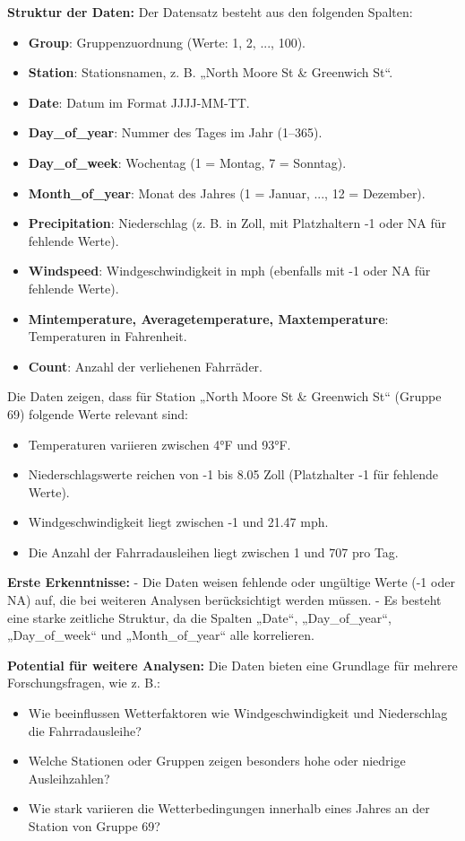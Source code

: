 \documentclass{article}
\begin{document}
\textbf{Struktur der Daten:}
Der Datensatz besteht aus den folgenden Spalten:
\begin{itemize}
    \item \textbf{Group}: Gruppenzuordnung (Werte: {1, 2, ..., 100}).
    \item \textbf{Station}: Stationsnamen, z. B. „North Moore St \& Greenwich St“.
    \item \textbf{Date}: Datum im Format JJJJ-MM-TT.
    \item \textbf{Day\_of\_year}: Nummer des Tages im Jahr (1–365).
    \item \textbf{Day\_of\_week}: Wochentag (1 = Montag, 7 = Sonntag).
    \item \textbf{Month\_of\_year}: Monat des Jahres (1 = Januar, ..., 12 = Dezember).
    \item \textbf{Precipitation}: Niederschlag (z. B. in Zoll, mit Platzhaltern -1 oder NA für fehlende Werte).
    \item \textbf{Windspeed}: Windgeschwindigkeit in mph (ebenfalls mit -1 oder NA für fehlende Werte).
    \item \textbf{Min\-temperature, Average\-temperature, Max\-temperature}: Temperaturen in Fahrenheit.
    \item \textbf{Count}: Anzahl der verliehenen Fahrräder.
\end{itemize}

Die Daten zeigen, dass für Station „North Moore St \& Greenwich St“ (Gruppe 69) folgende Werte relevant sind:
\begin{itemize}
    \item Temperaturen variieren zwischen 4°F und 93°F.
    \item Niederschlagswerte reichen von -1 bis 8.05 Zoll (Platzhalter -1 für fehlende Werte).
    \item Windgeschwindigkeit liegt zwischen -1 und 21.47 mph.
    \item Die Anzahl der Fahrradausleihen liegt zwischen 1 und 707 pro Tag.
\end{itemize}

\textbf{Erste Erkenntnisse:}
- Die Daten weisen fehlende oder ungültige Werte (-1 oder NA) auf, die bei weiteren Analysen berücksichtigt werden müssen. 
- Es besteht eine starke zeitliche Struktur, da die Spalten „Date“, „Day\_of\_year“, „Day\_of\_week“ und „Month\_of\_year“ alle korrelieren.

\textbf{Potential für weitere Analysen:}
Die Daten bieten eine Grundlage für mehrere Forschungsfragen, wie z. B.:
\begin{itemize}
    \item Wie beeinflussen Wetterfaktoren wie Windgeschwindigkeit und Niederschlag die Fahrradausleihe?
    \item Welche Stationen oder Gruppen zeigen besonders hohe oder niedrige Ausleihzahlen?
    \item Wie stark variieren die Wetterbedingungen innerhalb eines Jahres an der Station von Gruppe 69?
\end{itemize}
\end{document}
